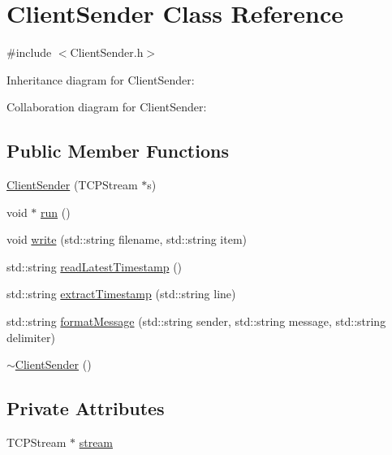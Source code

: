 \hypertarget{classClientSender}{\section{Client\+Sender Class Reference}
\label{classClientSender}
}


{\ttfamily \#include $<$Client\+Sender.\+h$>$}



Inheritance diagram for Client\+Sender\+:


Collaboration diagram for Client\+Sender\+:
\subsection*{Public Member Functions}
\begin{DoxyCompactItemize}
\item 
\hyperlink{classClientSender_a68887996652ae32c75ab07986add0384}{Client\+Sender} (T\+C\+P\+Stream $\ast$s)
\item 
void $\ast$ \hyperlink{classClientSender_a3d209f97ec2f3b0765d1614ccca81d0f}{run} ()
\item 
void \hyperlink{classClientSender_a195906837b950fe1d3027eaecbf6e402}{write} (std\+::string filename, std\+::string item)
\item 
std\+::string \hyperlink{classClientSender_a6e6a285497abc3da5d404feb8f383b44}{read\+Latest\+Timestamp} ()
\item 
std\+::string \hyperlink{classClientSender_aa204b656270125385e9062a6c6d22c96}{extract\+Timestamp} (std\+::string line)
\item 
std\+::string \hyperlink{classClientSender_ab1e5c68a97f796a7dc8497897376174d}{format\+Message} (std\+::string sender, std\+::string message, std\+::string delimiter)
\item 
\hyperlink{classClientSender_a0b877bd4ce2d5cda5d0d6ce905ed7ce9}{$\sim$\+Client\+Sender} ()
\end{DoxyCompactItemize}
\subsection*{Private Attributes}
\begin{DoxyCompactItemize}
\item 
T\+C\+P\+Stream $\ast$ \hyperlink{classClientSender_a3acb5a84c63b3c38f710622e190ce1e4}{stream}
\end{DoxyCompactItemize}


